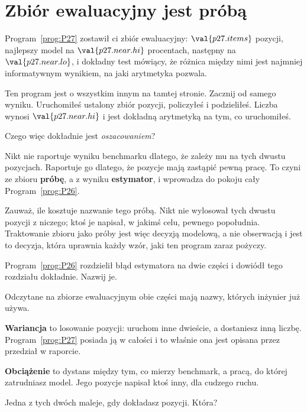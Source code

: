 \section{Zbiór ewaluacyjny jest próbą}
\label{sec:P34-a-sample}

\begin{fr}
Program~\ref{prog:P27} zostawił ci zbiór ewaluacyjny: $\val{p27.items}$
pozycji, najlepszy model na $\val{p27.near.hi}$ procentach, następny na
$\val{p27.near.lo}$, i dokładny test mówiący, że różnica między nimi jest
najmniej informatywnym wynikiem, na jaki arytmetyka pozwala.

Ten program jest o wszystkim innym na tamtej stronie. Zacznij od samego
wyniku. Uruchomiłeś ustalony zbiór pozycji, policzyłeś i podzieliłeś. Liczba
wynosi $\val{p27.near.hi}$ i jest dokładną arytmetyką na tym, co uruchomiłeś.

Czego więc dokładnie jest \emph{oszacowaniem}?
\dotline
\nextframe
\end{fr}

\begin{fr}

Nikt nie raportuje wyniku benchmarku dlatego, że zależy mu na tych dwustu
pozycjach. Raportuje go dlatego, że pozycje mają zastąpić pewną pracę. To
czyni ze zbioru \textbf{próbę}, a z wyniku \textbf{estymator}, i wprowadza do
pokoju cały Program~\ref{prog:P26}.

Zauważ, ile kosztuje nazwanie tego próbą. Nikt nie wylosował tych dwustu
pozycji z niczego; ktoś je napisał, w jakimś celu, pewnego popołudnia.
Traktowanie zbioru jako próby jest więc decyzją modelową, a nie obserwacją
\dash{} i jest to decyzja, która uprawnia każdy wzór, jaki ten program zaraz
pożyczy.

Program~\ref{prog:P26} rozdzielił błąd estymatora na dwie części i dowiódł
tego rozdziału dokładnie. Nazwij je.
\dotline
\nextframe
\end{fr}

\begin{fr}

Odczytane na zbiorze ewaluacyjnym obie części mają nazwy, których inżynier
już używa.

\textbf{Wariancja} to losowanie pozycji: uruchom inne dwieście, a dostaniesz
inną liczbę. Program~\ref{prog:P27} posiada ją w całości i to właśnie ona jest
opisana przez przedział w raporcie.

\textbf{Obciążenie} to dystans między tym, co mierzy benchmark, a pracą, do
której zatrudniasz model. Jego pozycje napisał ktoś inny, dla cudzego ruchu.

Jedna z tych dwóch maleje, gdy dokładasz pozycji. Która?
\dotline
\nextframe
\end{fr}

